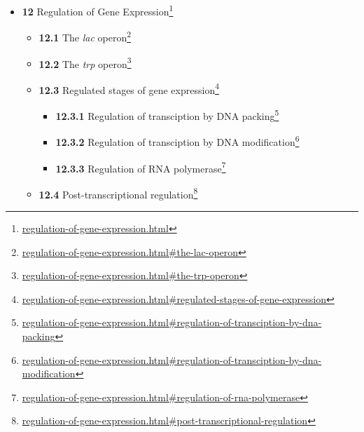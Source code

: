 \documentclass[
]{article}
\providecommand{\tightlist}{%
  \setlength{\itemsep}{0pt}\setlength{\parskip}{0pt}}
\providecommand{\tightlist}{%
  \setlength{\itemsep}{0pt}\setlength{\parskip}{0pt}}
\let\rmarkdownfootnote\footnote%
\def\footnote{\protect\rmarkdownfootnote}
\renewcommand{\href}[2]{#2\footnote{\url{#1}}}
\theoremstyle{definition}
\theoremstyle{definition}
\theoremstyle{definition}
\theoremstyle{remark}
\begin{document}
\begin{itemize}
\begin{itemize}
    \begin{itemize}
    \tightlist
    \item
      \href{molecular-biology-of-the-gene.html\#polymerase-chain-reaction}{\emph{}\textbf{11.4.1}
      Polymerase chain reaction}
    \item
      \href{molecular-biology-of-the-gene.html\#dna-sequencing}{\emph{}\textbf{11.4.2}
      DNA Sequencing}
    \item
      \href{molecular-biology-of-the-gene.html\#dna-microarray}{\emph{}\textbf{11.4.3}
      DNA Microarray}
    \item
      \href{molecular-biology-of-the-gene.html\#recombinant-dna}{\emph{}\textbf{11.4.4}
      Recombinant DNA}
    \item
      \href{molecular-biology-of-the-gene.html\#gene-synthesis}{\emph{}\textbf{11.4.5}
      Gene Synthesis}
    \item
      \href{molecular-biology-of-the-gene.html\#gene-knockout}{\emph{}\textbf{11.4.6}
      Gene Knockout}
    \item
      \href{molecular-biology-of-the-gene.html\#crispr-gene-editing}{\emph{}\textbf{11.4.7}
      CRISPR Gene Editing}
    \item
      \href{molecular-biology-of-the-gene.html\#human-germline-modification}{\emph{}\textbf{11.4.8}
      Human Germline Modification}
    \end{itemize}
  \end{itemize}
\item
  \href{regulation-of-gene-expression.html}{\emph{}\textbf{12}
  Regulation of Gene Expression}

  \begin{itemize}
  \tightlist
  \item
    \href{regulation-of-gene-expression.html\#the-lac-operon}{\emph{}\textbf{12.1}
    The \emph{lac} operon}
  \item
    \href{regulation-of-gene-expression.html\#the-trp-operon}{\emph{}\textbf{12.2}
    The \emph{trp} operon}
  \item
    \href{regulation-of-gene-expression.html\#regulated-stages-of-gene-expression}{\emph{}\textbf{12.3}
    Regulated stages of gene expression}

    \begin{itemize}
    \tightlist
    \item
      \href{regulation-of-gene-expression.html\#regulation-of-transciption-by-dna-packing}{\emph{}\textbf{12.3.1}
      Regulation of transciption by DNA packing}
    \item
      \href{regulation-of-gene-expression.html\#regulation-of-transciption-by-dna-modification}{\emph{}\textbf{12.3.2}
      Regulation of transciption by DNA modification}
    \item
      \href{regulation-of-gene-expression.html\#regulation-of-rna-polymerase}{\emph{}\textbf{12.3.3}
      Regulation of RNA polymerase}
    \end{itemize}
  \item
    \href{regulation-of-gene-expression.html\#post-transcriptional-regulation}{\emph{}\textbf{12.4}
    Post-transcriptional regulation}


\end{itemize}
\end{itemize}
\end{document}
